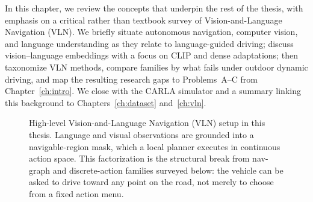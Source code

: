 In this chapter, we review the concepts that underpin the rest of the thesis, with emphasis on a critical rather than textbook survey of Vision-and-Language Navigation (VLN). We briefly situate autonomous navigation, computer vision, and language understanding as they relate to language-guided driving; discuss vision--language embeddings with a focus on CLIP and dense adaptations; then taxonomize VLN methods, compare families by what fails under outdoor dynamic driving, and map the resulting research gaps to Problems~A--C from Chapter~\ref{ch:intro}. We close with the CARLA simulator and a summary linking this background to Chapters~\ref{ch:dataset} and~\ref{ch:vln}.

\begin{figure}[ht]
    \centering
    \caption[Grounding-first VLN setup]{High-level Vision-and-Language Navigation (VLN) setup in this thesis. Language and visual observations are grounded into a navigable-region mask, which a local planner executes in continuous action space. This factorization is the structural break from nav-graph and discrete-action families surveyed below: the vehicle can be asked to drive toward any point on the road, not merely to choose from a fixed action menu.}
    \label{fig:vln_setup_schematic}
\end{figure}

